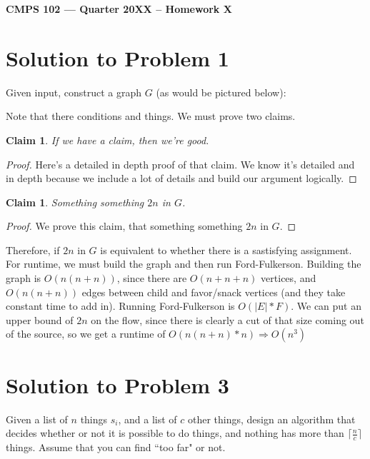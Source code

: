 \documentclass[11pt]{article}
\newtheorem{claim}[theorem]{Claim}
\begin{document}
\begin{center}
{\bf\Large CMPS 102 --- Quarter 20XX --  Homework X}
\end{center}

\section*{Solution to Problem 1}

Given input, construct a graph $G$ (as would be pictured below):


Note that there conditions and things. We must prove two claims.
\begin{claim} 
If we have a claim, then we're good.
\end{claim}
\begin{proof}
Here's a detailed in depth proof of that claim. We know it's detailed and in depth because we include a lot of details and build our argument logically.
\end{proof}

\begin{claim} 
Something something $2n$ in $G$. 
\end{claim}
\begin{proof}
We prove this claim, that something something $2n$ in $G$.
\end{proof}
Therefore, if $2n$ in $G$ is equivalent to whether there is a sastisfying assignment. For runtime, we must build the graph and then run Ford-Fulkerson. Building the graph is $O(n(n+n))$, since there are $O(n+n+n)$ vertices, and $O(n(n+n))$ edges between child and favor/snack vertices (and they take constant time to add in). Running Ford-Fulkerson is $O(|E|*F)$. We can put an upper bound of $2n$ on the flow, since there is clearly a cut of that size coming out of the source, so we get a runtime of $O(n(n+n) * n) \Rightarrow O(n^{3})$

\newpage

\section*{Solution to Problem 3}



Given a list of $n$ things $s_i$, and a list of $c$ other things, design an algorithm that decides whether or not it is possible to do things, and nothing has more than $\lceil \frac{n}{c} \rceil$ things. Assume that you can find ``too far" or not.
\end{document}
